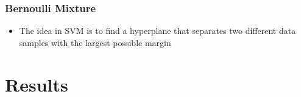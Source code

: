 \documentclass[hyperref={pdfpagelabels=false}]{beamer}
\begin{document}
\frame
{
  \frametitle{Bernoulli Mixture}

  \begin{itemize}
    \item The idea in SVM is to find a hyperplane that separates two different data samples with the largest possible margin 
  \end{itemize}

}

\section{Results}
\subsection{}
\frame
\end{document}
